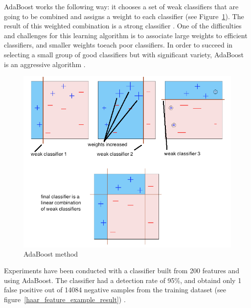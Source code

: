 \noindent AdaBoost works the following way: it chooses a set of weak classifiers that are going to be combined and assigns a weight to each classifier (see Figure~\ref{haar_feature_adaboost}). The result of this weighted combination is a strong classifier \cite{HEW07}. One of the difficulties and challenges for this learning algorithm is to associate large weights to efficient classifiers, and smaller weights toeach poor classifiers. In order to succeed in selecting a small group of good classifiers but with significant variety, AdaBoost is an aggressive algorithm \cite{VIO01}.
\newline

\begin{figure}[!h]
\begin{center}
\noindent \includegraphics[scale=0.6]{figures/haar_feature_adaboost} 
\newline
\caption{AdaBoost method}
\label{haar_feature_adaboost}
\end{center} 
\end{figure}

\noindent Experiments have been conducted with a classifier built from 200 features and using AdaBoost. The classifier had a detection rate of 95\%, and obtaind only 1 false positive out of 14084 negative samples from the training dataset (see figure~\ref{haar_feature_example_result}) \cite{VIO01}.
\newline

